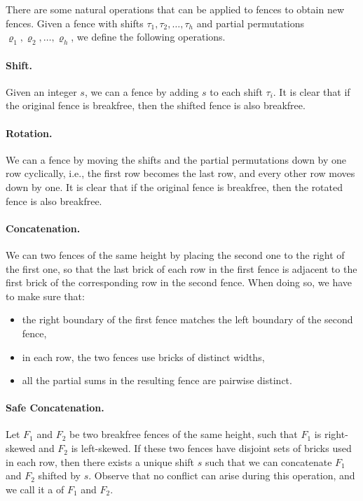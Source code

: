 \documentclass[runningheads,envcountsame]{llncs}
\let\rho\varrho
\begin{document}
There are some natural operations that can be applied to fences to obtain new fences.
Given a fence with shifts $\tau_1,\tau_2,\ldots,\tau_h$ and partial permutations $\rho_1,\rho_2,\ldots,\rho_h$, we define the following operations.
\paragraph{Shift.}
Given an integer $s$, we can  a fence by adding $s$ to each shift $\tau_i$.
It is clear that if the original fence is breakfree, then the shifted fence is also breakfree.
\paragraph{Rotation.}
We can  a fence by moving the shifts and the partial permutations down by one row cyclically, i.e., the first row becomes the last row, and every other row moves down by one.
It is clear that if the original fence is breakfree, then the rotated fence is also breakfree.
\paragraph{Concatenation.}
We can  two fences of the same height by placing the second one to the right of the first one, so that the last brick of each row in the first fence is adjacent to the first brick of the corresponding row in the second fence.
When doing so, we have to make sure that:
\begin{itemize}
    \item the right boundary of the first fence matches the left boundary of the second fence,
    \item in each row, the two fences use bricks of distinct widths,
    \item all the partial sums in the resulting fence are pairwise distinct.
\end{itemize}
\paragraph{Safe Concatenation.}
Let $F_1$ and $F_2$ be two breakfree fences of the same height, such that $F_1$ is right-skewed and $F_2$ is left-skewed.
If these two fences have disjoint sets of bricks used in each row, then  there exists a unique shift $s$ such that we can concatenate $F_1$ and $F_2$ shifted by $s$.
Observe that no conflict can arise during this operation, and we call it a  of $F_1$ and $F_2$.
\end{document}
